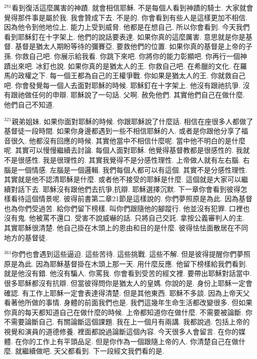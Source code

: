 \documentclass{book}
\begin{document}
$^{281}$看到復活這麼厲害的神蹟.
就會相信耶穌.
不是每個人看到神蹟的騎士.
大家就會覺得那件事是屬於我.
我會贊成下去.
不是的.
你會看到有些人是這樣更加不相信.
因為他令到他地位上.
能力上受到威脅.
他都是在想自己.
所以你會看到.
今天我們看到耶穌釘在十字架上.
他們的說話要表達.
如果你真的這麼厲害.
意思就是你是基督.
基督是猶太人期盼等待的彌賽亞.
要救他們的位置.
如果你真的基督是上帝的子孫.
你救自己吧.
你展示給我看.
你跳下來吧.
你將你的能力彰顯吧.
你再行一個神蹟出來吧.
冰釘也說.
如果你真的是猶太人的王.
你救自己吧.
在希臘的文化.
在羅馬的政權之下.
每一個王都為自己的王權爭戰.
你如果是猶太人的王.
你就救自己吧.
你會發覺每一個人去面對耶穌的時候.
耶穌釘在十字架上.
他沒有跟祂抗爭.
沒有跟祂做任何的申辯.
耶穌說了一句話.
父啊.
赦免他們.
其實他們自己在做什麼.
他們自己不知道.

$^{321}$親弟姐妹.
如果你面對耶穌的時候.
你跟耶穌說了什麼話.
相信在座很多人都做了基督徒一段時間.
如果你身邊都遇到一些不相信耶穌的人.
或者是你跟他分享了福音很久.
他都沒有回應的時候.
其實他當中不相信什麼呢.
當中他不明白的是什麼呢.
其實可以慢慢繼續去討論.
每個人面對耶穌.
他覺得基督教都是很感性的.
我就不是很感性.
我是很理性的.
其實我覺得不是分感性理性.
上帝做人就有左右腦.
右腦是一個情感.
左腦是一個邏輯.
我們每個人都可以有這個.
其實不是分感性理性.
其實就是他不認清耶穌是什麼.
或者他不接受的耶穌是什麼.
這個就是大家可以繼續對話下去.
耶穌沒有跟他們去抗爭,抗辯.
耶穌選擇沉默.
下一章你會看到彼得怎樣看待這個情景呢.
彼得前書第二章21節是這樣說的.
你們夢照原是為此.
因為基督也為你們受過苦.
給你們留下榜樣.
叫你們跟隨他的腳蹤行.
他並沒有犯罪.
口裡也沒有鬼.
他被罵不還口.
受害不說威嚇的話.
只將自己交託.
拿按公義審判人的主.
其實耶穌很清楚.
他自己掛在木頭上的恩由和目的是什麼.
彼得怯怯面散居在不同地方的基督徒.

$^{361}$你們也會遇到這些逼迫.
這些苦待.
這些挑戰.
這些不解.
但是彼得提醒你們夢照原是為此.
因為耶穌基督掛在木頭上那一天.
用什麼反應.
他留下榜樣給我們看到.
就是他沒有錯.
他沒有騙人.
你罵我.
你會看到受苦的經文裡.
要帶出耶穌對話當中.
很多耶穌都沒有抗辯.
但當彼得問你是猶太人的皇媽.
你說的是.
身份上耶穌一定會確認.
有工作上耶穌一定會表達得清楚.
但是其他東西.
耶穌不多談.
因為上帝天父看著他所做的事情.
身體的前面我們也是.
我們這幾年生命生活都改變很多.
但如果你真的每天都知道自己在做什麼的時候.
上帝都知道你在做什麼.
不需要被論斷.
你不需要論斷自己.
有關論斷這個課題.
我在上一個月有兩講.
我都說過.
包括上帝的視覺和演員的道德修養.
裡面都說過論斷這個內容.
今天很多人會留言.
在你的媒體.
在你的工作上有平頭品足.
但是你作為一個跟隨上帝的人.
你清楚自己在做什麼.
就繼續做吧.
天父都看到.
下一段經文我們看的是.
\end{document}
